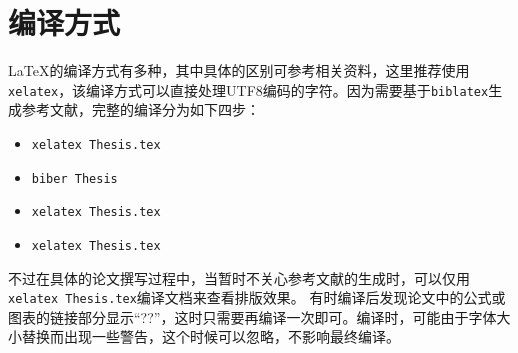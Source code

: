 \section{编译方式}

\par {\LaTeX}的编译方式有多种，其中具体的区别可参考相关资料，这里推荐使用\texttt{xelatex}，该编译方式可以直接处理UTF8编码的字符。因为需要基于\texttt{biblatex}生成参考文献，完整的编译分为如下四步：
\begin{itemize}
\item \texttt{xelatex Thesis.tex}
\item \texttt{biber Thesis}
\item \texttt{xelatex Thesis.tex}
\item \texttt{xelatex Thesis.tex}
\end{itemize}
不过在具体的论文撰写过程中，当暂时不关心参考文献的生成时，可以仅用\texttt{xelatex Thesis.tex}编译文档来查看排版效果。{\color{red} 有时编译后发现论文中的公式或图表的链接部分显示“??”，这时只需要再编译一次即可。编译时，可能由于字体大小替换而出现一些警告，这个时候可以忽略，不影响最终编译。}




